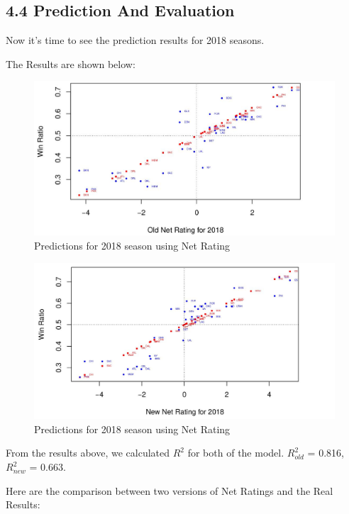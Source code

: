 \documentclass[11pt]{article}
\begin{document}
\subsection*{4.4 Prediction And Evaluation}

Now it's time to see the prediction results for 2018 seasons.

The Results are shown below:

\begin{figure}[h!]
  \centering
    \includegraphics[width=\linewidth]{old_nr_pre.jpg}
  \caption{Predictions for 2018 season using Net Rating}
\end{figure}

\begin{figure}[h!]
  \centering
    \includegraphics[width=\linewidth]{new_nr_pre.jpg}
  \caption{Predictions for 2018 season using Net Rating}
\end{figure}

From the results above, we calculated $R^2$ for both of the model. $R^2_{old}$ = 0.816, $R^2_{new}$ = 0.663.

Here are the comparison between two versions of Net Ratings and the Real Results:\\
\end{document}
